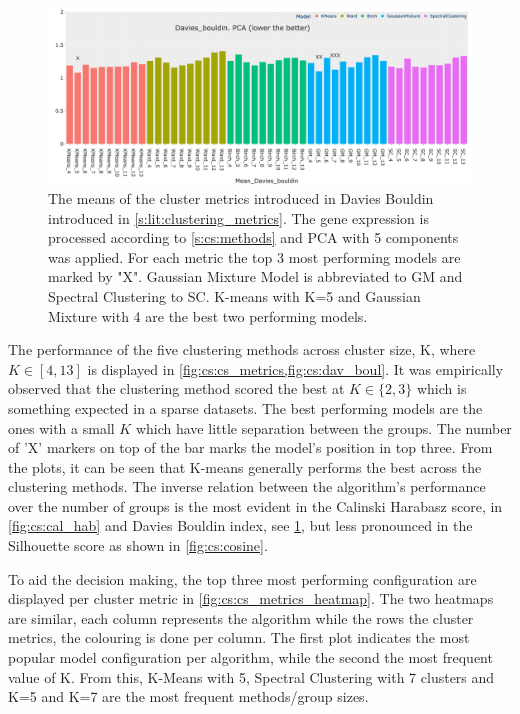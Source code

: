 \begin{figure}[!htb]    
    \centering
    \includegraphics[width=1.0\textwidth,keepaspectratio]{Sections/ClusteringAnalysis/Resources/cs_top3/PCA_top3_Davies_bouldin.png}
    \caption[Measuring clustering models: Davies Boulding]{The means of the cluster metrics introduced in Davies Bouldin introduced in \cref{s:lit:clustering_metrics}. The gene expression is processed according to \cref{s:cs:methods} and PCA with 5 components was applied. For each metric the top 3 most performing models are marked by "X". Gaussian Mixture Model is abbreviated to GM and Spectral Clustering to SC. K-means with K=5 and Gaussian Mixture with 4 are the best two performing models.}
    \label{fig:cs:dav_boul}
\end{figure}

The performance of the five clustering methods across cluster size, K, where $K\in[4, 13]$ is displayed in \cref{fig:cs:cs_metrics,fig:cs:dav_boul}. It was empirically observed that the clustering method scored the best at $K\in\{2,3\}$ which is something expected in a sparse datasets. The best performing models are the ones with a small $K$ which have little separation between the groups. The number of 'X' markers on top of the bar marks the model's position in top three. From the plots, it can be seen that  K-means generally performs the best across the clustering methods. The inverse relation between the algorithm's performance over the number of groups is the most evident in the Calinski Harabasz score, in \cref{fig:cs:cal_hab} and Davies Bouldin index, see \cref{fig:cs:dav_boul}, but less pronounced in the Silhouette score as shown in \cref{fig:cs:cosine}.


To aid the decision making, the top three most performing configuration are displayed per cluster metric in \cref{fig:cs:cs_metrics_heatmap}. The two heatmaps are similar, each column represents the algorithm while the rows the cluster metrics, the colouring is done per column. The first plot indicates the most popular model configuration per algorithm, while the second the most frequent value of K. From this, K-Means with 5, Spectral Clustering with 7 clusters and K=5 and K=7 are the most frequent methods/group sizes. 


